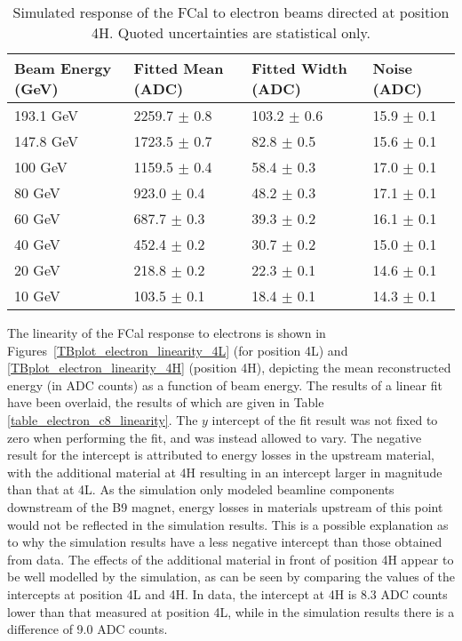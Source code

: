 \begin{table}[p]
\begin{center}
\begin{tabular}{|l|l|l|l|}
\hline
Beam Energy (GeV) & Fitted Mean (ADC)& Fitted Width (ADC)& Noise (ADC) \\
\hline
193.1 GeV  &  2259.7 $\pm$     0.8 &   103.2 $\pm$     0.6 &    15.9 $\pm$     0.1 \\
147.8 GeV  &  1723.5 $\pm$     0.7 &    82.8 $\pm$     0.5 &    15.6 $\pm$     0.1 \\
100 GeV  &  1159.5 $\pm$     0.4 &    58.4 $\pm$     0.3 &    17.0 $\pm$     0.1 \\
80 GeV  &   923.0 $\pm$     0.4 &    48.2 $\pm$     0.3 &    17.1 $\pm$     0.1 \\
60 GeV  &   687.7 $\pm$     0.3 &    39.3 $\pm$     0.2 &    16.1 $\pm$     0.1 \\
40 GeV  &   452.4 $\pm$     0.2 &    30.7 $\pm$     0.2 &    15.0 $\pm$     0.1 \\
20 GeV  &   218.8 $\pm$     0.2 &    22.3 $\pm$     0.1 &    14.6 $\pm$     0.1 \\
10 GeV  &   103.5 $\pm$     0.1 &    18.4 $\pm$     0.1 &    14.3 $\pm$     0.1 \\
\hline
\end{tabular}
\end{center}
\caption{Simulated response of the FCal to electron beams directed at position 4H. Quoted uncertainties are statistical only.}
\label{TBres_table_elec_4HMC}
\end{table}

The linearity of the FCal response to electrons is shown in Figures~\ref{TBplot_electron_linearity_4L} (for position 4L) and \ref{TBplot_electron_linearity_4H} (position 4H), depicting the mean reconstructed energy (in ADC counts) as a function of beam energy. The results of a linear fit have been overlaid, the results of which are given in Table \ref{table_electron_c8_linearity}. The $y$ intercept of the fit result was not fixed to zero when performing the fit, and was instead allowed to vary. The negative result for the intercept is attributed to energy losses in the upstream material, with the additional material at 4H resulting in an intercept larger in magnitude than that at 4L. As the simulation only modeled beamline components downstream of the B9 magnet, energy losses in materials upstream of this point would not be reflected in the simulation results. This is a possible explanation as to why the simulation results have a less negative intercept than those obtained from data. The effects of the additional material in front of position 4H appear to be well modelled by the simulation, as can be seen by comparing the values of the intercepts at position 4L and 4H. In data, the intercept at 4H is 8.3 ADC counts lower than that measured at position 4L, while in the simulation results there is a difference of 9.0 ADC counts. 


